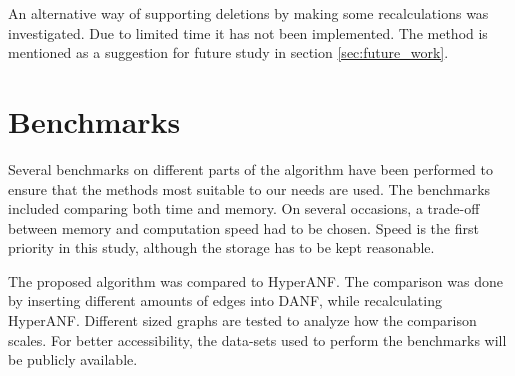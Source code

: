 An alternative way of supporting deletions by making some recalculations was investigated. Due to limited time it has not been implemented. The method is mentioned as a suggestion for future study in section \ref{sec:future_work}.

\section{Benchmarks} 
Several benchmarks on different parts of the algorithm have been performed to ensure that the methods most suitable to our needs are used. The benchmarks included comparing both time and memory. On several occasions, a trade-off between memory and computation speed had to be chosen. Speed is the first priority in this study, although the storage has to be kept reasonable. 

The proposed algorithm was compared to HyperANF. The comparison was done by inserting different amounts of edges into DANF, while recalculating HyperANF. Different sized graphs are tested to analyze how the comparison scales. For better accessibility, the data-sets used to perform the benchmarks will be publicly available.

